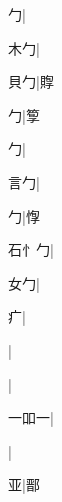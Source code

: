 \begin{multicols}{2}
{{\cjk{}{\cnsym{}　}{\cnsym{}　}勹}|{}\par
{\cjk{}{\cnsym{}　}木勹}|{}\par
{\cjk{}{\cnsym{}　}貝勹}|{\cjk{}賯}\par
{勹}|{\cjk{}箰}\par
{勹}|{}\par
{\cjk{}{\cnsym{}　}言勹}|{}\par
{勹}|{\cjk{}惸}\par
{\cjk{}石{忄}勹}|{}\par
{\cjk{}{\cnsym{}　}女勹}|{}\par
{\cjk{}{\cnsym{}　}{\cnsym{}　}疒}|{}\par
{}|{}\par
{}|{}\par
{\cjk{}一吅一}|{}\par
{}|{}\par
{\cjk{}{\cnsym{}　}{\cnsym{}　}亚}|{\cjk{}鄑}\par
}
\end{multicols}
